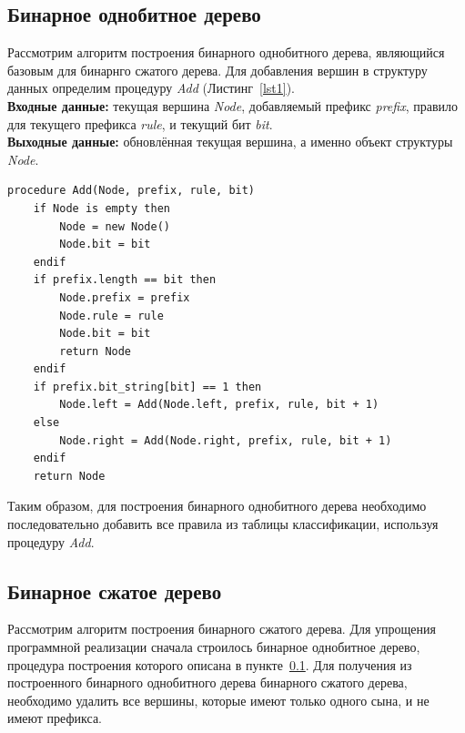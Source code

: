 \documentclass[conference]{IEEEtran}
\begin{document}
        \subsection{Бинарное однобитное дерево}
        \label{section:binone}
            Рассмотрим алгоритм построения бинарного однобитного дерева, являющийся базовым для бинарнго сжатого дерева.
            Для добавления вершин в структуру данных определим процедуру \emph{Add} (Листинг~\ref{lst1}).\\
            {\bf Входные данные:} текущая вершина \emph{Node}, добавляемый префикс \emph{prefix}, правило для текущего префикса \emph{rule}, и текущий бит \emph{bit}.\\
            {\bf Выходные данные:} обновлённая текущая вершина, а именно объект структуры \emph{Node}.
\\
\begin{lstlisting}[caption=Процедура добавления вершины в бинарное однобитное дерево., label=lst1]
procedure Add(Node, prefix, rule, bit)
    if Node is empty then
        Node = new Node()
        Node.bit = bit
    endif
    if prefix.length == bit then
        Node.prefix = prefix
        Node.rule = rule
        Node.bit = bit
        return Node
    endif
    if prefix.bit_string[bit] == 1 then
        Node.left = Add(Node.left, prefix, rule, bit + 1)
    else
        Node.right = Add(Node.right, prefix, rule, bit + 1)
    endif
    return Node
\end{lstlisting}
\vspace{1em}
            Таким образом, для построения бинарного однобитного дерева необходимо последовательно добавить все правила из таблицы классификации,
            используя процедуру \emph{Add}.

        \subsection{Бинарное сжатое дерево}
            Рассмотрим алгоритм построения бинарного сжатого дерева. Для упрощения программной реализации сначала строилось бинарное однобитное дерево,
            процедура построения которого описана в пункте~\ref{section:binone}. Для получения из построенного бинарного однобитного дерева бинарного сжатого дерева,
            необходимо удалить все вершины, которые имеют только одного сына, и не имеют префикса.
\end{document}
